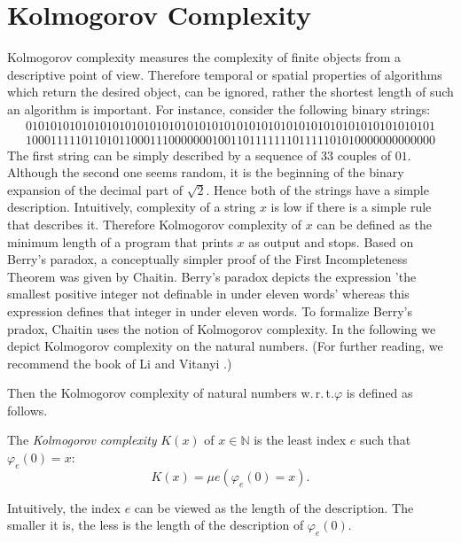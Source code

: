 \section{Kolmogorov Complexity}
Kolmogorov complexity measures the complexity of finite objects from a descriptive point of view. Therefore temporal or spatial properties of algorithms which return the desired object, can be ignored, rather the shortest length of such an algorithm is important. For instance, consider the following binary strings:
\begin{align*}
010101010101010101010101010101010101010101010101010101010101010101 \\
100011111011010110001110000000100110111111101111101010000000000000
\end{align*}
The first string can be simply described by a sequence of $33$ couples of $01$. Although the second one seems random, it is the beginning of the binary expansion of the decimal part of $\sqrt{2}$. Hence both of the strings have a simple description. Intuitively, complexity of a string $x$ is low if there is a simple rule that describes it. Therefore Kolmogorov complexity of $x$ can be defined as the minimum length of a program that prints $x$ as output and stops. 
Based on Berry's paradox, a conceptually simpler proof of the First Incompleteness Theorem was given by Chaitin. Berry's paradox depicts the expression 'the smallest positive integer not definable in under eleven words' whereas this expression defines that integer in under eleven words. To formalize Berry's pradox, Chaitin uses the notion of Kolmogorov complexity. In the following we depict Kolmogorov complexity on the natural numbers. (For further reading, we recommend the book of Li and Vitanyi \Cite{Li2008}.)

Then the Kolmogorov complexity of natural numbers w.\,r.\,t.\@ $\varphi$ is defined as follows.
\begin{dfn}
The \textit{Kolmogorov complexity} $K(x)$ of $x \in \mathbb{N}$ is the least index $e$ such that $\varphi_e(0) = x$:\[K(x) = \mu e (\varphi_e(0) = x ).\]
\end{dfn}
Intuitively, the index $e$ can be viewed as the length of the description. The smaller it is, the less is the length of the description of $\varphi_e(0)$.

